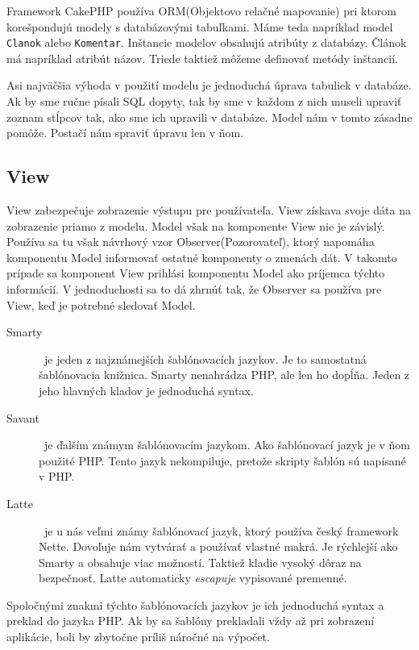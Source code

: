 \documentclass[12pt]{book}
\begin{document}
Framework CakePHP používa ORM(Objektovo relačné mapovanie) pri ktorom korešpondujú modely s databázovými tabuľkami. Máme teda napríklad model \texttt{Clanok} alebo \texttt{Komentar}. Inštancie modelov obsahujú atribúty z databázy. Článok má napríklad atribút názov. Triede taktiež môžeme definovať metódy inštancií.

Asi najväčšia výhoda v použití modelu je jednoduchá úprava tabuliek v databáze.  Ak by sme ručne písali SQL dopyty, tak by sme v každom z nich museli upraviť zoznam stĺpcov tak, ako sme ich upravili v databáze. Model nám v tomto zásadne pomôže. Postačí nám spraviť úpravu len v ňom.

\subsection{View}
View zabezpečuje zobrazenie výstupu pre používateľa. View získava svoje dáta na zobrazenie priamo z modelu. Model však na komponente View nie je závislý. Používa sa tu však návrhový vzor Observer(Pozorovateľ), ktorý napomáha komponentu Model  informovať ostatné komponenty o zmenách dát. V takomto prípade sa komponent View prihlási komponentu Model ako príjemca týchto informácií. V jednoduchosti sa to dá zhrnúť tak, že Observer sa používa pre View, keď je potrebné sledovať Model.
\newline

\begin{description}
\item [Smarty] \cite{Smarty}\  je jeden z najznámejších šablónovacích jazykov. Je to samostatná šablónovacia knižnica. Smarty nenahrádza PHP, ale len ho dopĺňa. Jeden z jeho hlavných kladov je jednoduchá syntax.
\item [Savant] \cite{Savant}\  je ďalším známym šablónovacím jazykom. Ako šablónovací jazyk je v ňom použité PHP. Tento jazyk nekompiluje, pretože skripty šablón sú napísané v PHP.
\item [Latte] \cite{Latte}\  je u nás veľmi známy šablónovací jazyk, ktorý používa český framework Nette. Dovoľuje nám vytvárať a používať vlastné makrá. Je rýchlejší ako Smarty a obsahuje viac možností. Taktiež kladie vysoký dôraz na bezpečnosť. Latte automaticky \emph{escapuje} vypisované premenné.
\end{description}

Spoločnými znakmi týchto šablónovacích jazykov je ich jednoduchá syntax a preklad do jazyka PHP. Ak by sa šablóny prekladali vždy až pri zobrazení aplikácie, boli by zbytočne príliš náročné na výpočet.
\end{document}
